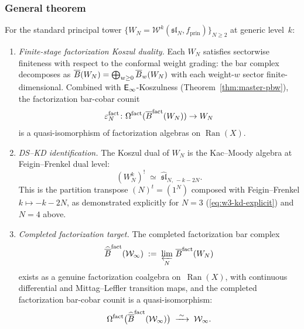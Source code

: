 \subsubsection*{General theorem}

\begin{theorem}
\label{thm:winfty-factorization-kd}
For the standard principal tower
$\{W_N = \mathcal{W}^k(\mathfrak{sl}_N, f_{\mathrm{prin}})\}_{N \ge 2}$
at generic level~$k$:
\begin{enumerate}[label=\textup{(\roman*)}]
\item \emph{Finite-stage factorization Koszul duality.}
  Each $W_N$ satisfies sectorwise finiteness with respect to
  the conformal weight grading: the bar complex decomposes as
  $\overline{B}(W_N) = \bigoplus_{w \ge 0} \overline{B}_w(W_N)$ with each
  weight-$w$ sector finite-dimensional.
  Combined with $\mathsf{E}_{\infty}$-Koszulness
  \textup{(}Theorem~\textup{\ref{thm:master-pbw})},
  the factorization bar-cobar counit
  \[
  \varepsilon_N^{\mathrm{fact}}\colon
  \Omega^{\mathrm{fact}}(\overline{B}^{\mathrm{fact}}(W_N)) \to W_N
  \]
  is a quasi-isomorphism of factorization algebras
  on $\operatorname{Ran}(X)$.

\item \emph{DS--KD identification.}
  The Koszul dual of $W_N$ is the Kac--Moody algebra at
  Feigin--Frenkel dual level:
  \begin{equation}\label{eq:winfty-stage-kd}
  (W_N^k)^!
  \;\simeq\;
  \widehat{\mathfrak{sl}}_{N,\,-k-2N}.
  \end{equation}
  This is the partition transpose
  $(N)^t = (1^N)$ composed with Feigin--Frenkel
  $k \mapsto -k - 2N$, as demonstrated explicitly for $N = 3$
  \textup{(\eqref{eq:w3-kd-explicit})} and $N = 4$ above.

\item \emph{Completed factorization target.}
  The completed factorization bar complex
  \[
  \widehat{\overline{B}}^{\mathrm{fact}}(\mathcal{W}_\infty)
  \;:=\;
  \varprojlim_N\, \overline{B}^{\mathrm{fact}}(W_N)
  \]
  exists as a genuine factorization coalgebra
  on~$\operatorname{Ran}(X)$, with continuous differential and
  Mittag--Leffler transition maps, and the completed factorization
  bar-cobar counit is a quasi-isomorphism:
  \[
  \Omega^{\mathrm{fact}}\bigl(
    \widehat{\overline{B}}^{\mathrm{fact}}(\mathcal{W}_\infty)
  \bigr)
  \;\xrightarrow{\;\sim\;}\;
  \mathcal{W}_\infty.
  \]


\end{enumerate}
\end{theorem}

